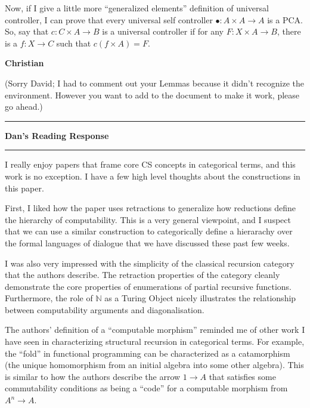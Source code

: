 \documentclass{amsart}
\newcommand{\iam}[1]{
  \vspace{0.25em}
  \hrule
  \vspace{0.25em}
  \textbf{{#1}'s Reading Response}
  \vspace{0.25em}
  \hrule
  \vspace{1em}
}
\newcommand{\respond}[1]{
  \vspace{1em} \textbf{#1}
}
\begin{document}
Now, if I give a little more ``generalized elements'' definition of universal controller, I can prove that every universal self controller $\bullet : A \times A \to A$ is a PCA. So, say that $c : C \times A \to B$ is a universal controller if for any $F : X \times A \to B$, there is a $f : X \to C$ such that $c(f \times A) = F$.


\respond{Christian}

(Sorry David; I had to comment out your Lemmas because it didn't recognize the environment. However you want to add to the document to make it work, please go ahead.)


\iam{Dan}
I really enjoy papers that frame core CS concepts in categorical terms, and this work is no exception. I have a few high level thoughts about the constructions in this paper.

First, I liked how the paper uses retractions to generalize how reductions define the hierarchy of computability. This is a very general viewpoint, and I suspect that we can use a similar construction to categorically define a hierarachy over the formal languages of dialogue that we have discussed these past few weeks.

I was also very impressed with the simplicity of the classical recursion category that the authors describe. The retraction properties of the category cleanly demonstrate the core properties of enumerations of partial recursive functions. Furthermore, the role of $\mathbb{N}$ as a Turing Object nicely illustrates the relationship between computability arguments and diagonalisation.

The authors' definition of a ``computable morphism'' reminded me of other work I have seen in characterizing structural recursion in categorical terms. For example, the ``fold'' in functional programming can be characterized as a catamorphism (the unique homomorphism from an initial algebra into some other algebra). This is similar to how the authors describe the arrow $1 \rightarrow A$ that satisfies some commutability conditions as being a ``code'' for a computable morphism from $A^n \rightarrow A$.
\end{document}
